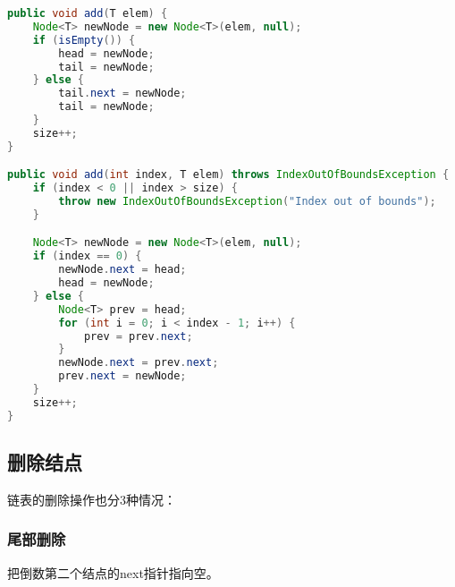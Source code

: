 \begin{lstlisting}[language=Java]
public void add(T elem) {
	Node<T> newNode = new Node<T>(elem, null);
	if (isEmpty()) {
		head = newNode;
		tail = newNode;
	} else {
		tail.next = newNode;
		tail = newNode;
	}
	size++;
}

public void add(int index, T elem) throws IndexOutOfBoundsException {
	if (index < 0 || index > size) {
		throw new IndexOutOfBoundsException("Index out of bounds");
	}

	Node<T> newNode = new Node<T>(elem, null);
	if (index == 0) {
		newNode.next = head;
		head = newNode;
	} else {
		Node<T> prev = head;
		for (int i = 0; i < index - 1; i++) {
			prev = prev.next;
		}
		newNode.next = prev.next;
		prev.next = newNode;
	}
	size++;
}
\end{lstlisting}

\vspace{0.5cm}

\subsection{删除结点}

链表的删除操作也分3种情况：

\subsubsection{尾部删除}

把倒数第二个结点的next指针指向空。

